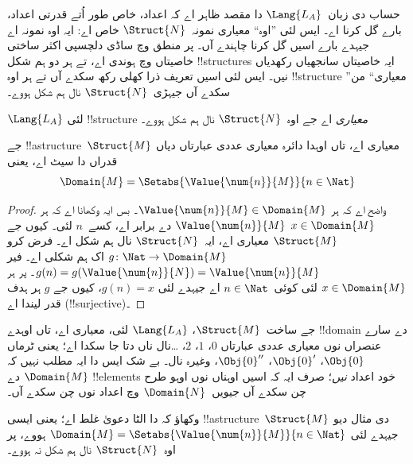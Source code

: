 \documentclass[../../../include/open-logic-section]{subfiles}
\begin{document}

حساب دی زبان~$\Lang{L_A}$ دا مقصد ظاہر اے کہ اعداد،
خاص طور اُتے قدرتی اعداد، بارے گل کرنا اے۔ ایس لئی ”اوہ“
معیاری نمونہ~$\Struct{N}$ خاص اے: ایہ اوہ نمونہ اے
جیہدے بارے اسیں گل کرنا چاہندے آں۔ پر منطق وچ ساڈی
دلچسپی اکثر ساختی خاصیتاں وچ ہوندی اے، تے ہر دو
ہم شکل !!{structure}s ایہ خاصیتاں سانجھیاں رکھدیاں نیں۔
ایس لئی اسیں تعریف ذرا کھلی رکھ سکدے آں تے ہر اوہ
!!{structure} ”معیاری“ من سکدے آں جیہڑی~$\Struct{N}$
نال ہم شکل ہووے۔

\begin{defn}
$\Lang{L_A}$ لئی !!{structure} \emph{معیاری} اے
جے اوہ~$\Struct{N}$ نال ہم شکل ہووے۔
\end{defn}

\begin{prop}
 جے !!a{structure}~$\Struct{M}$
معیاری اے، تاں اوہدا دائرہ معیاری عددی عبارتاں دیاں
قدراں دا سیٹ اے، یعنی
\[
\Domain{M} = \Setabs{\Value{\num{n}}{M}}{n \in \Nat}
\]
\end{prop}

\begin{proof}
واضح اے کہ ہر $\Value{\num{n}}{M} \in \Domain{M}$۔
بس ایہ وکھانا اے کہ ہر $x \in \Domain{M}$
$\Value{\num{n}}{M}$ دے برابر اے، کسے~$n$ لئی۔
کیوں جے $\Struct{M}$ معیاری اے، ایہ~$\Struct{N}$
نال ہم شکل اے۔ فرض کرو $g\colon \Nat \to \Domain{M}$
اک ہم شکلی اے۔ فیر $g(n) = g(\Value{\num{n}}{N}) =
\Value{\num{n}}{M}$۔ پر ہر $x \in \Domain{M}$
لئی کوئی~$n \in \Nat$ اے جیہدے لئی $g(n) = x$،
کیوں جے $g$ ہر ہدف قدر لیندا اے (!!{surjective})۔
\end{proof}

\begin{explain}
جے ساخت~$\Struct{M}$، $\Lang{L_A}$ لئی، معیاری اے،
تاں اوہدے !!{domain} دے سارے عنصراں نوں
معیاری عددی عبارتاں $\num{0}$، $\num{1}$،
$\num{2}$، \dots نال ناں دتا جا سکدا اے؛
یعنی ٹرماں $\Obj{0}$، $\Obj{0}'$،
$\Obj{0}''$، وغیرہ نال۔ بے شک ایس دا ایہ مطلب نہیں کہ
$\Domain{M}$ دے !!{element}s خود اعداد \emph{نیں}؛
صرف ایہ کہ اسیں اوہناں نوں اوہو طرح چن سکدے آں
جیویں~$\Domain{N}$ وچ اعداد نوں چن سکدے آں۔
\end{explain}

\begin{prob}
وکھاؤ کہ 
دا الٹا دعویٰ غلط اے؛ یعنی ایسی !!a{structure}~$\Struct{M}$
دی مثال دیو جیہدے لئی
$\Domain{M} = \Setabs{\Value{\num{n}}{M}}{n \in \Nat}$
ہووے، پر اوہ~$\Struct{N}$ نال ہم شکل نہ ہووے۔
\end{prob}
\end{document}
